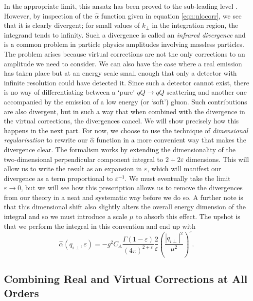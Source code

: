 In the appropriate limit, this ansatz has been proved to the sub-leading level \cite{Bogdan2006,Fadin2005,Fadin2004,Fadin2006}. However, by inspection of the $\hat{\alpha}$ function given in equation \ref{eqn:nlocorr}, we see that it is clearly divergent; for small values of $k_\perp$ in the integration region, the integrand tends to infinity. Such a divergence is called an \emph{infrared divergence} and is a common problem in particle physics amplitudes involving massless particles. The problem arises because virtual corrections are not the only corrections to an amplitude we need to consider. We can also have the case where a real emission has taken place but at an energy scale small enough that only a detector with infinite resolution could have detected it. Since such a detector cannot exist, there is no way of differentiating between a `pure' $qQ \to qQ$ scattering and another one accompanied by the emission of a low energy (or `soft') gluon. Such contributions are also divergent, but in such a way that when combined with the divergence in the virtual corrections, the divergences cancel. We will show precisely how this happens in the next part. For now, we choose to use the technique of \emph{dimensional regularisation} to rewrite our $\hat{\alpha}$ function in a more convenient way that makes the divergence clear. The formalism works by extending the dimensionality of the two-dimensional perpendicular component integral to $2 + 2 \varepsilon$ dimensions. This will allow us to write the result as an expansion in $\varepsilon$, which will manifest our divergence as a term proportional to $\varepsilon^{-1}$. We must eventually take the limit $\varepsilon \to 0$, but we will see how this prescription allows us to remove the divergences from our theory in a neat and systematic way before we do so. A further note is that this dimensional shift also slightly alters the overall energy dimension of the integral and so we must introduce a scale $\mu$ to absorb this effect. The upshot is that we perform the integral in this convention and end up with %
\begin{equation}
\hat{\alpha}(q_{i \perp}, \varepsilon) = - g^2 C_A \frac{\Gamma(1 - \varepsilon)}{(4 \pi)^{2 + \varepsilon}} \frac{2}{\varepsilon} \left(\frac{|q_{i \perp}|^2}{\mu^2} \right)^\varepsilon.
\end{equation}

\subsection{Combining Real and Virtual Corrections at All Orders}

